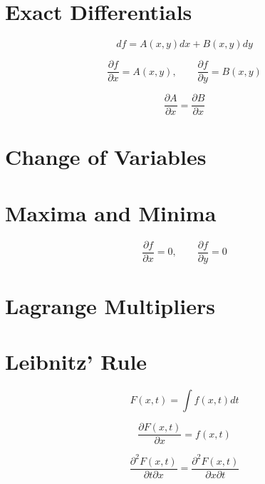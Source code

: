 \section{Exact Differentials}

\begin{equation*}
    df = A(x, y)dx + B(x, y)dy
\end{equation*}

\begin{equation*}
    \frac{\partial f}{\partial x} = A(x, y), \qquad \frac{\partial f}{\partial y} = B(x, y)
\end{equation*}

\begin{equation*}
    \frac{\partial A}{\partial x} = \frac{\partial B}{\partial x}
\end{equation*}

\section{Change of Variables}

\section{Maxima and Minima}

\begin{equation*}
    \frac{\partial f}{\partial x} = 0, \qquad \frac{\partial f}{\partial y} = 0
\end{equation*}

\section{Lagrange Multipliers}

\section{Leibnitz' Rule}

\begin{equation*}
    F(x,t) = \int f(x,t)dt
\end{equation*}

\begin{equation*}
    \frac{\partial F(x,t)}{\partial x} = f(x,t)
\end{equation*}

\begin{equation*}
    \frac{\partial^{2}F(x,t)}{\partial t \partial x} = \frac{\partial^{2}F(x,t)}{\partial x \partial t}
\end{equation*}

